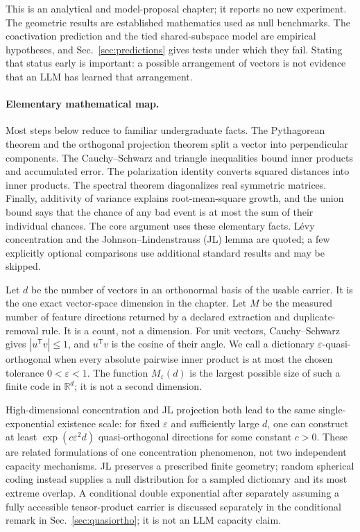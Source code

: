 \documentclass[
  aps,
  reprint,
  superscriptaddress,
  floatfix,
  nofootinbib,
  longbibliography
]{revtex4-2}
\newcommand{\R}{\mathbb{R}}
\newcommand{\Msem}{M}
\newcommand{\T}{^{\mathsf{T}}}
\begin{document}
This is an analytical and model-proposal chapter; it reports no new experiment.
The geometric results are established mathematics used as null benchmarks.
The coactivation prediction and the tied shared-subspace model are empirical
hypotheses, and Sec.~\ref{sec:predictions} gives tests under which they fail.
Stating that status early is important: a possible arrangement of vectors is
not evidence that an LLM has learned that arrangement.

\paragraph{Elementary mathematical map.}
Most steps below reduce to familiar undergraduate facts.  The Pythagorean
theorem and the orthogonal projection theorem split a vector into perpendicular
components.  The Cauchy--Schwarz and triangle inequalities bound inner products
and accumulated error.  The polarization identity converts squared distances
into inner products.  The spectral theorem diagonalizes real symmetric
matrices.  Finally, additivity of variance explains root-mean-square growth,
and the union bound says that the chance of any bad event is at most the sum of
their individual chances.  The core argument uses these elementary facts.
L\'evy concentration and the Johnson--Lindenstrauss (JL) lemma are quoted;
a few explicitly optional comparisons use additional standard results and may
be skipped.

Let $d$ be the number of vectors in an orthonormal basis of the usable carrier.
It is the one exact vector-space dimension in the chapter.  Let $\Msem$ be the
measured number of feature directions returned by a declared extraction and
duplicate-removal rule.  It is a count, not a dimension.  For unit vectors,
Cauchy--Schwarz gives $|u\T v|\leq1$, and $u\T v$ is the cosine of their angle.
We call a dictionary $\varepsilon$-quasi-orthogonal when every absolute
pairwise inner product is at most the chosen tolerance
$0<\varepsilon<1$.  The function $M_\varepsilon(d)$ is the largest possible
size of such a finite code in $\R^d$; it is not a second dimension.

High-dimensional concentration and JL projection both lead to the same
single-exponential existence scale: for fixed $\varepsilon$ and sufficiently
large $d$, one can construct at least
$\exp(c\varepsilon^2d)$ quasi-orthogonal directions for some constant $c>0$.
These are related formulations of one concentration phenomenon, not two
independent capacity mechanisms.  JL preserves a prescribed finite geometry;
random spherical coding instead supplies a null distribution for a sampled
dictionary and its most extreme overlap.  A conditional double exponential
after separately assuming a fully accessible tensor-product carrier is
discussed separately in the conditional remark in
Sec.~\ref{sec:quasiortho}; it is not an LLM capacity
claim.
\end{document}

